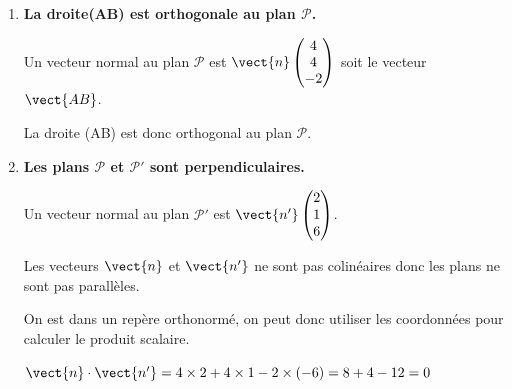 \begin{enumerate}
$\begin{aligned} \begin{cases}- 3 + 2 s=-6+3t\\ 1 + 2s=1 \\ 4-s =9-5t\end{cases} & \iff \begin{cases}2 s -3t =-3\\ s=0 \\ s-5t=-5\end{cases} &
& \iff \begin{cases}-3t =-3\\ s=0 \\ -5t=-5\end{cases}
& \iff\begin{cases}t =1\\ s=0 \\ t=1\end{cases}\\
\end{aligned}$

Le système admet une unique solution donc les droites sont sécantes. 

\item \textbf{La droite(AB) est orthogonale au plan $\mathcal{P}$.}

Un vecteur normal au plan $\mathcal{P}$ est $\vect{n}\begin{pmatrix}4\\4\\-2\end{pmatrix}$ soit le vecteur $\vect{AB}$.

La droite (AB) est donc orthogonal au plan $\mathcal{P}$.

\item \textbf{Les plans $\mathcal{P}$ et $\mathcal{P}'$ sont perpendiculaires.}

Un vecteur normal au plan $\mathcal{P'}$ est $\vect{n'}\begin{pmatrix}
2\\1\\6
\end{pmatrix}$.

Les vecteurs $\vect{n}$ et $\vect{n'}$ ne sont pas colinéaires donc les plans ne sont pas parallèles.

On est dans un repère orthonormé, on peut donc utiliser les coordonnées pour calculer le produit scalaire.

$\vect{n} \cdot \vect{n'} = 4  \times 2+ 4\times 1-2 \times (-6) = 8+4-12=0$


\end{enumerate}
